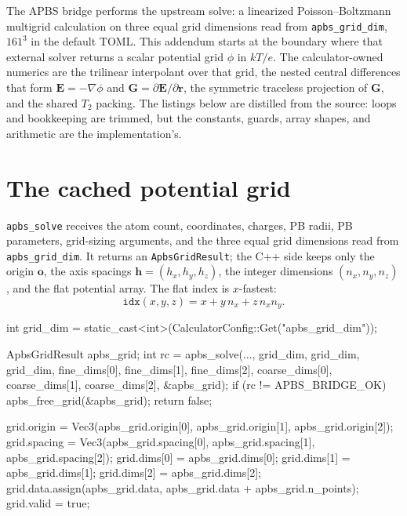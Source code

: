 \documentclass[11pt]{article}
\newcommand{\code}[1]{\texttt{#1}}
\begin{document}

The APBS bridge performs the upstream solve: a linearized Poisson--Boltzmann
multigrid calculation on three equal grid dimensions read from
\code{apbs\_grid\_dim}, \(161^3\) in the default TOML. This addendum starts at
the boundary where that external solver returns a scalar potential grid
\(\phi\) in \(kT/e\). The calculator-owned numerics are the trilinear
interpolant over that grid, the nested central differences that form
\(\bm E=-\nabla\phi\) and \(\bm G=\partial\bm E/\partial\bm r\), the symmetric
traceless projection of \(\bm G\), and the shared \(T_2\) packing. The listings
below are distilled from the source: loops and bookkeeping are trimmed, but the
constants, guards, array shapes, and arithmetic are the implementation's.

\section{The cached potential grid}

\code{apbs\_solve} receives the atom count, coordinates, charges, PB radii, PB
parameters, grid-sizing arguments, and the three equal grid dimensions read
from \code{apbs\_grid\_dim}. It returns an \code{ApbsGridResult}; the C++ side keeps
only the origin \(\bm o\), the axis spacings
\(\bm h=(h_x,h_y,h_z)\), the integer dimensions \((n_x,n_y,n_z)\), and the flat
potential array. The flat index is \(x\)-fastest:
\[
  \code{idx}(x,y,z)=x+y\,n_x+z\,n_x n_y .
\]

\begin{codebox}
int grid_dim = static_cast<int>(CalculatorConfig::Get("apbs_grid_dim"));

ApbsGridResult apbs_grid;
int rc = apbs_solve(...,
                    grid_dim, grid_dim, grid_dim,
                    fine_dims[0], fine_dims[1], fine_dims[2],
                    coarse_dims[0], coarse_dims[1], coarse_dims[2],
                    &apbs_grid);
if (rc != APBS_BRIDGE_OK) {
    apbs_free_grid(&apbs_grid);
    return false;
}

grid.origin  = Vec3(apbs_grid.origin[0],
                    apbs_grid.origin[1],
                    apbs_grid.origin[2]);
grid.spacing = Vec3(apbs_grid.spacing[0],
                    apbs_grid.spacing[1],
                    apbs_grid.spacing[2]);
grid.dims[0] = apbs_grid.dims[0];
grid.dims[1] = apbs_grid.dims[1];
grid.dims[2] = apbs_grid.dims[2];
grid.data.assign(apbs_grid.data, apbs_grid.data + apbs_grid.n_points);
grid.valid = true;
\end{codebox}
\end{document}
